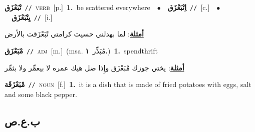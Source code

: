\documentclass[10pt,a4paper,twoside]{article} %
\begin{document}
\begin{multicols}{2}
{\setlength\topsep{0pt}\textbf{\foreignlanguage{arabic}{تْبَعْزَق}}\ {\color{gray}\texttt{//}\color{black}}\ \textsc{verb}\ [p.]\ \textbf{1.}~be scattered everywhere\ \ $\bullet$\ \ \setlength\topsep{0pt}\textbf{\foreignlanguage{arabic}{اِتْبَعْزَق}}\ {\color{gray}\texttt{//}\color{black}}\ [c.]\ \ $\bullet$\ \ \setlength\topsep{0pt}\textbf{\foreignlanguage{arabic}{يِتْبَعْزَق}}\ {\color{gray}\texttt{//}\color{black}}\ [i.]\  \begin{flushright}\color{gray}\foreignlanguage{arabic}{\textbf{\underline{\foreignlanguage{arabic}{أمثلة}}}: لما بهدلني حسيت كرامتي تْبَعْزَقت بالأرض}\end{flushright}\color{black}} \vspace{2mm}

{\setlength\topsep{0pt}\textbf{\foreignlanguage{arabic}{مْبَعْزَق}}\ {\color{gray}\texttt{//}\color{black}}\ \textsc{adj}\ [m.]\ \color{gray}(msa. \foreignlanguage{arabic}{مُبَذِّر}~\foreignlanguage{arabic}{\textbf{١.}})\color{black}\ \textbf{1.}~spendthrift\  \begin{flushright}\color{gray}\foreignlanguage{arabic}{\textbf{\underline{\foreignlanguage{arabic}{أمثلة}}}: يختي جوزك مْبَعْزَق وإِذا ضل هيك عمره لا بيعمِّر ولا بثمِّر}\end{flushright}\color{black}} \vspace{2mm}

{\setlength\topsep{0pt}\textbf{\foreignlanguage{arabic}{مْبَعْزَقَة}}\ {\color{gray}\texttt{//}\color{black}}\ \textsc{noun}\ [f.]\ \textbf{1.}~it is a dish that is made of fried potatoes with eggs, salt and some black pepper.\ } \vspace{2mm}

\vspace{-3mm}
\subsection*{\color{blue}\foreignlanguage{arabic}{ب.ع.ص}\color{blue}{}} 


\end{multicols}
\end{document}
